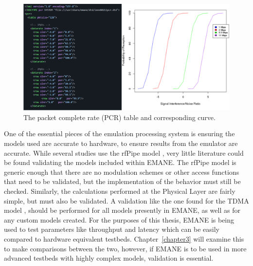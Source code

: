 \begin{figure}[!ht]
    \centering
    \includegraphics[width=\textwidth,keepaspectratio]{Images/Chpt2/emane_pcr.png}
    \caption{The packet complete rate (PCR) table and corresponding curve.}
    \label{emane_pcr}
\end{figure}

One of the essential pieces of the emulation processing system is ensuring the models used are accurate to hardware, to ensure results from the emulator are accurate.
While several studies use the rfPipe model \cite{rfPipe1, rfPipe2, rfPipe3}, very little literature could be found validating the models included within EMANE.
The rfPipe model is generic enough that there are no modulation schemes or other access functions that need to be validated, but the implementation of the behavior must still be checked.
Similarly, the calculations performed at the Physical Layer are fairly simple, but must also be validated.
A validation like the one found for the TDMA model \cite{emane_tdma}, should be performed for all models presently in EMANE, as well as for any custom models created.
For the purposes of this thesis, EMANE is being used to test parameters like throughput and latency which can be easily compared to hardware equivalent testbeds.
Chapter~\ref{chapter3} will examine this to make comparisons between the two, however, if EMANE is to be used in more advanced testbeds with highly complex models, validation is essential.

